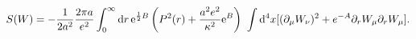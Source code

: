 \begin{equation}
S(W)= -\frac{1}{2 a^2}{2\pi a\over e^2}\int_0^\infty{\rm d}r\,{\rm
e}^{{1\over 2}B} \left(P^2(r)+{a^2e^2\over \kappa^2}{\rm e}^B\right)~
\int{\rm d}^4x[(\partial_\mu  W_\nu)^2 + e^{-A} \partial_r
W_\mu\partial_r W_\mu].
\label{eq3'}
\end{equation}

